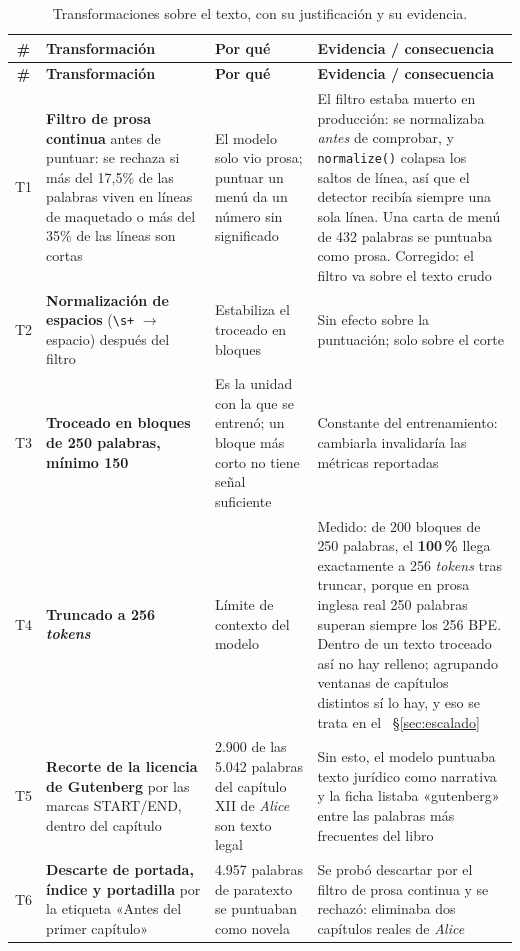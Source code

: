 \documentclass[11pt,a4paper]{article}
\newcommand{\cod}[1]{\texttt{\small #1}}
\newcommand{\pct}{\,\%}
\begin{document}
\begin{small}
\begin{longtable}{@{}c L{3.2cm} L{3.4cm} L{5.6cm}@{}}
\toprule
\textbf{\#} & \textbf{Transformación} & \textbf{Por qué} & \textbf{Evidencia / consecuencia} \\
\midrule
\endfirsthead
\toprule
\textbf{\#} & \textbf{Transformación} & \textbf{Por qué} & \textbf{Evidencia / consecuencia} \\
\midrule
\endhead
\bottomrule
\endfoot
\bottomrule
\caption{Transformaciones sobre el texto, con su justificación y su evidencia.}
\label{cuad:textos}
\endlastfoot
T1 & \textbf{Filtro de prosa continua} antes de puntuar: se rechaza si más del 17,5\% de las palabras viven en líneas de maquetado o más del 35\% de las líneas son cortas & El modelo solo vio prosa; puntuar un menú da un número sin significado & El filtro estaba muerto en producción: se normalizaba \emph{antes} de comprobar, y \cod{normalize()} colapsa los saltos de línea, así que el detector recibía siempre una sola línea. Una carta de menú de 432 palabras se puntuaba como prosa. Corregido: el filtro va sobre el texto crudo \\
\addlinespace
T2 & \textbf{Normalización de espacios} (\cod{\textbackslash s+} $\rightarrow$ espacio) después del filtro & Estabiliza el troceado en bloques & Sin efecto sobre la puntuación; solo sobre el corte \\
\addlinespace
T3 & \textbf{Troceado en bloques de 250 palabras, mínimo 150} & Es la unidad con la que se entrenó; un bloque más corto no tiene señal suficiente & Constante del entrenamiento: cambiarla invalidaría las métricas reportadas \\
\addlinespace
T4 & \textbf{Truncado a 256 \emph{tokens}} & Límite de contexto del modelo & Medido: de 200 bloques de 250 palabras, el \textbf{100\pct} llega exactamente a 256 \emph{tokens} tras truncar, porque en prosa inglesa real 250 palabras superan siempre los 256 BPE. Dentro de un texto troceado así no hay relleno; agrupando ventanas de capítulos distintos sí lo hay, y eso se trata en el ~\S\ref{sec:escalado} \\
\addlinespace
T5 & \textbf{Recorte de la licencia de Gutenberg} por las marcas START/END, dentro del capítulo & 2.900 de las 5.042 palabras del capítulo XII de \emph{Alice} son texto legal & Sin esto, el modelo puntuaba texto jurídico como narrativa y la ficha listaba «gutenberg» entre las palabras más frecuentes del libro \\
\addlinespace
T6 & \textbf{Descarte de portada, índice y portadilla} por la etiqueta «Antes del primer capítulo» & 4.957 palabras de paratexto se puntuaban como novela & Se probó descartar por el filtro de prosa continua y se rechazó: eliminaba dos capítulos reales de \emph{Alice} \\

\end{longtable}
\end{small}
\end{document}
